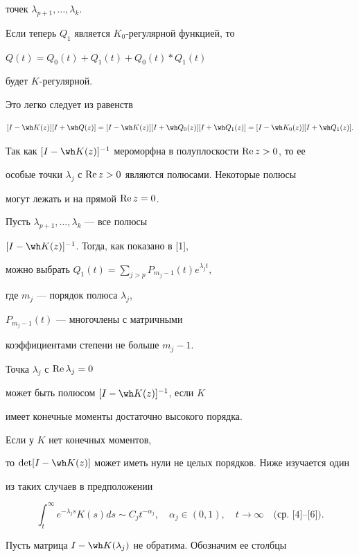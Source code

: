 точек $\lambda_{p+1},\dotsc,\lambda_k$. 


Если теперь $Q_1$ является $K_0$-регулярной функцией, то


$Q(t)=Q_0(t)+Q_1(t)+Q_0(t)*Q_1(t)$


будет $K$-регулярной.


Это легко следует из равенств


$$


[I-\wh K(z)][I+\wh Q(z)]=[I-\wh K(z)][I+\wh Q_0(z)]


[I+\wh Q_1(z)]=[I-\wh K_0(z)][I+\wh Q_1(z)].


$$





Так как $[I-\wh K(z)]^{-1}$ мероморфна в полуплоскости $\operatorname{Re} z>0$, то ее


особые точки $\lambda_j$  с $\operatorname{Re} z>0$ являются полюсами. Некоторые полюсы


могут лежать и на прямой $\operatorname{Re} z=0$.


Пусть $\lambda_{p+1},\dotsc,\lambda_k$ --- все полюсы


$[I-\wh K(z)]^{-1}$. Тогда, как показано в [1],


можно выбрать $Q_1(t)=\sum\limits_{j>p}P_{m_j-1}(t)e^{\lambda_j t},$


где $m_j$ --- порядок полюса $\lambda_j$,


$P_{m_j-1}(t)$ --- многочлены с матричными


коэффициентами степени не больше $m_j-1$.





Точка $\lambda_j$ с $\operatorname{Re} \lambda_j=0$ 


может быть полюсом $[I-\wh K(z)]^{-1}$, если $K$


имеет конечные моменты достаточно высокого порядка. 


Если у $K$ нет конечных моментов,


то $\det[I-\wh K(z)]$ может иметь нули не целых порядков. Ниже изучается один


из таких случаев в предположении


$$


\int_t^{\infty} e^{-\lambda_js}K(s)ds\sim C_jt^{-\alpha_j},


\quad \alpha_j \in (0,1),\quad t\rightarrow \infty


\quad \text{(ср. [4]--[6])}.


$$


Пусть матрица $I-\wh K(\lambda_j)$ не обратима. Обозначим ее столбцы


